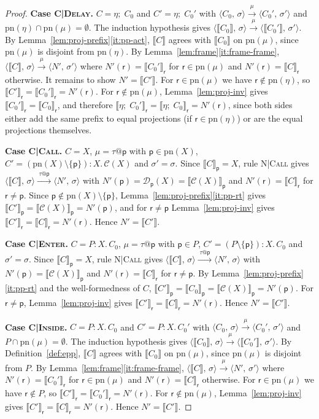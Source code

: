 \documentclass[11pt]{article}
\makeatletter
\theoremstyle{plain}
\theoremstyle{definition}
\theoremstyle{remark}
\newcommand{\seq}{;\;}
\newcommand{\pp}{\mathsf{p}}
\newcommand{\rr}{\mathsf{r}}
\newcommand{\pn}{\mathrm{pn}}
\newcommand{\conf}[2]{\langle #1,\, #2\rangle}
\newcommand{\lto}[1]{\xrightarrow{\;#1\;}}
\newcommand{\proj}[2]{\llbracket #1 \rrbracket_{#2}}
\newcommand{\projn}[1]{\llbracket #1 \rrbracket}
\newcommand{\tauat}[1]{\tau\mathord{@}#1}
\newcommand{\rn}[1]{{\normalfont\scshape #1}}
\newcommand{\case}[1]{\medskip\noindent\textbf{Case #1.}\;}
\newcommand{\Defs}{\mathcal{C}}
\newcommand{\NDefs}{\mathcal{D}}
\newcommand{\body}[1]{\Defs(#1)}
\newcommand{\ldef}[2]{\NDefs_{#1}(#2)}
\newcommand{\rt}[3]{#1\mathbin{:}#2.\,#3}
\makeatother
\begin{document}
\begin{proof}
  \case{\rn{C|Delay}}
  $C = \eta\seq C_0$ and $C' = \eta\seq C_0'$ with
  $\conf{C_0}{\sigma}\lto{\mu}\conf{C_0'}{\sigma'}$ and
  $\pn(\eta)\cap\pn(\mu) = \emptyset$.  The induction hypothesis gives
  $\conf{\projn{C_0}}{\sigma}\lto{\mu}\conf{\projn{C_0'}}{\sigma'}$.  By
  Lemma~\ref{lem:proj-prefix}\ref{it:pp-act}, $\projn{C}$ agrees with
  $\projn{C_0}$ on $\pn(\mu)$, since $\pn(\mu)$ is disjoint from $\pn(\eta)$.
  By Lemma~\ref{lem:frame}\ref{it:frame-frame},
  $\conf{\projn{C}}{\sigma}\lto{\mu}\conf{N'}{\sigma'}$ where
  $N'(\rr) = \proj{C_0'}{\rr}$ for $\rr\in\pn(\mu)$ and $N'(\rr) = \proj{C}{\rr}$
  otherwise.  It remains to show $N' = \projn{C'}$.  For $\rr\in\pn(\mu)$ we
  have $\rr\notin\pn(\eta)$, so $\proj{C'}{\rr} = \proj{C_0'}{\rr} = N'(\rr)$.
  For $\rr\notin\pn(\mu)$, Lemma~\ref{lem:proj-inv} gives
  $\proj{C_0'}{\rr} = \proj{C_0}{\rr}$, and therefore
  $\proj{\eta\seq C_0'}{\rr} = \proj{\eta\seq C_0}{\rr} = N'(\rr)$, since both
  sides either add the same prefix to equal projections (if $\rr\in\pn(\eta)$)
  or are the equal projections themselves.

  \case{\rn{C|Call}}
  $C = X$, $\mu = \tauat\pp$ with $\pp\in\pn(X)$,
  $C' = \rt{(\pn(X)\setminus\{\pp\})}{X}{\body{X}}$ and $\sigma' = \sigma$.
  Since $\proj{C}{\pp} = X$, rule \rn{N|Call} gives
  $\conf{\projn{C}}{\sigma}\lto{\tauat\pp}\conf{N'}{\sigma}$ with
  $N'(\pp) = \ldef{\pp}{X} = \proj{\body{X}}{\pp}$ and $N'(\rr) = \proj{C}{\rr}$
  for $\rr\neq\pp$.  Since $\pp\notin\pn(X)\setminus\{\pp\}$,
  Lemma~\ref{lem:proj-prefix}\ref{it:pp-rt} gives
  $\proj{C'}{\pp} = \proj{\body{X}}{\pp} = N'(\pp)$, and for $\rr\neq\pp$
  Lemma~\ref{lem:proj-inv} gives $\proj{C'}{\rr} = \proj{C}{\rr} = N'(\rr)$.
  Hence $N' = \projn{C'}$.

  \case{\rn{C|Enter}}
  $C = \rt{P}{X}{C_0}$, $\mu = \tauat\pp$ with $\pp\in P$,
  $C' = \rt{(P\setminus\{\pp\})}{X}{C_0}$ and $\sigma' = \sigma$.  Since
  $\proj{C}{\pp} = X$, rule \rn{N|Call} gives
  $\conf{\projn{C}}{\sigma}\lto{\tauat\pp}\conf{N'}{\sigma}$ with
  $N'(\pp) = \proj{\body{X}}{\pp}$ and $N'(\rr) = \proj{C}{\rr}$ for
  $\rr\neq\pp$.  By Lemma~\ref{lem:proj-prefix}\ref{it:pp-rt} and the
  well-formedness of $C$, $\proj{C'}{\pp} = \proj{C_0}{\pp} = \proj{\body{X}}{\pp} = N'(\pp)$.
  For $\rr\neq\pp$, Lemma~\ref{lem:proj-inv} gives
  $\proj{C'}{\rr} = \proj{C}{\rr} = N'(\rr)$.  Hence $N' = \projn{C'}$.

  \case{\rn{C|Inside}}
  $C = \rt{P}{X}{C_0}$ and $C' = \rt{P}{X}{C_0'}$ with
  $\conf{C_0}{\sigma}\lto{\mu}\conf{C_0'}{\sigma'}$ and
  $P\cap\pn(\mu) = \emptyset$.  The induction hypothesis gives
  $\conf{\projn{C_0}}{\sigma}\lto{\mu}\conf{\projn{C_0'}}{\sigma'}$.  By
  Definition~\ref{def:epp}, $\projn{C}$ agrees with $\projn{C_0}$ on
  $\pn(\mu)$, since $\pn(\mu)$ is disjoint from $P$.  By
  Lemma~\ref{lem:frame}\ref{it:frame-frame},
  $\conf{\projn{C}}{\sigma}\lto{\mu}\conf{N'}{\sigma'}$ where
  $N'(\rr) = \proj{C_0'}{\rr}$ for $\rr\in\pn(\mu)$ and
  $N'(\rr) = \proj{C}{\rr}$ otherwise.  For $\rr\in\pn(\mu)$ we have
  $\rr\notin P$, so $\proj{C'}{\rr} = \proj{C_0'}{\rr} = N'(\rr)$.  For
  $\rr\notin\pn(\mu)$, Lemma~\ref{lem:proj-inv} gives
  $\proj{C'}{\rr} = \proj{C}{\rr} = N'(\rr)$.  Hence $N' = \projn{C'}$.
\end{proof}
\end{document}
